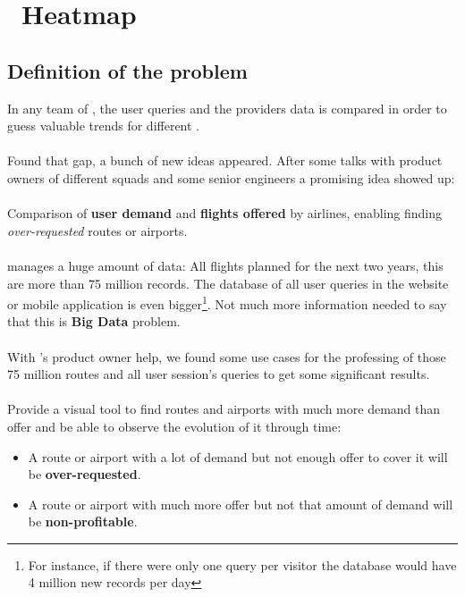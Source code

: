 
\chapter{\company\ Heatmap }

\label{chapter03}


\section{Definition of the problem} \label{problem}

In any team of \company, the user queries and the providers data is compared in order to guess valuable trends for different .
\\\\
Found that gap, a bunch of new ideas appeared. After some talks with product owners of different squads and some senior engineers a promising idea showed up:
\\\\
Comparison of \textbf{user demand} and \textbf{flights offered} by airlines, enabling finding \textit{over-requested} routes or airports. 
\\\\
\squad manages a huge amount of data: All flights planned for the next two years, this are more than 75 million records. The database of all user queries in the website or mobile application is even bigger\footnote{For instance, if there were only one query per visitor the database would have 4 million new records per day}. Not much more information needed to say that this is \textbf{Big Data} problem.
\\\\
With \squad's product owner help, we found some use cases for the professing of those 75 million routes and all user session's queries to get some significant results.
\\\\
Provide a visual tool to find routes and airports with much more demand than offer and be able to observe the evolution of it through time:

\begin{itemize}
  \item A route or airport with a lot of demand but not enough offer to cover it will be \textbf{over-requested}.
  \item A route or airport with much more offer but not that amount of demand will be \textbf{non-profitable}.
\end{itemize}

